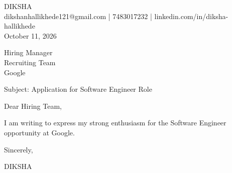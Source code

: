 \documentclass[11pt,a4paper]{article}
\begin{document}
DIKSHA \\
dikshanhallikhede121@gmail.com | 7483017232 | linkedin.com/in/diksha-hallikhede \\
October 11, 2026 \par \vspace{10pt}
Hiring Manager \\
Recruiting Team \\
Google \par \vspace{10pt}
Subject: Application for Software Engineer Role \par \vspace{10pt}
Dear Hiring Team, \par \vspace{10pt}
I am writing to express my strong enthusiasm for the Software Engineer opportunity at Google. \par \vspace{10pt}
Sincerely, \par \vspace{10pt}
DIKSHA \par \vspace{10pt}
\end{document}
